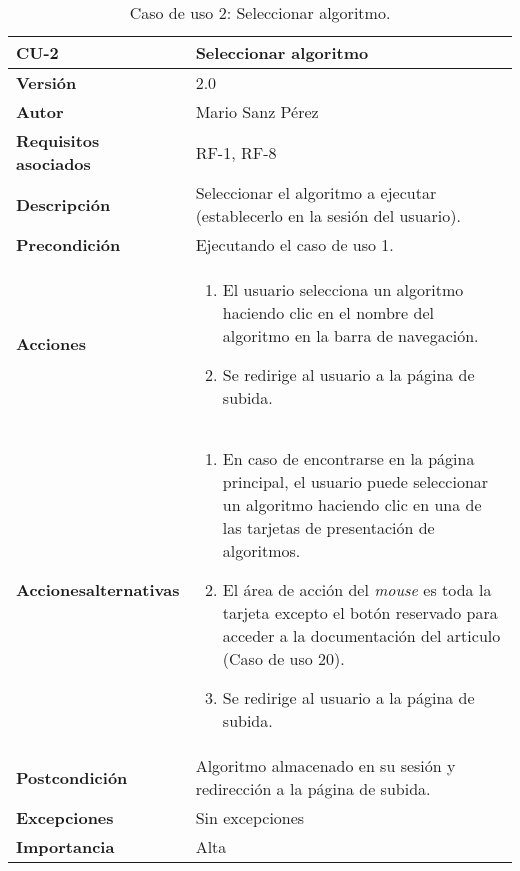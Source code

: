 \begin{table}[p]
	\centering
	\begin{tabularx}{\linewidth}{ p{} p{} }
		\toprule
		\textbf{CU-2}    & \textbf{Seleccionar algoritmo}\\
		\toprule
		\textbf{Versión}              & 2.0    \\
		\textbf{Autor}                & Mario Sanz Pérez \\
		\textbf{Requisitos asociados} & RF-1, RF-8 \\
		\textbf{Descripción}          & Seleccionar el algoritmo a ejecutar (establecerlo en la sesión del usuario). \\
		\textbf{Precondición}         & Ejecutando el caso de uso 1. \\
		\textbf{Acciones}             &
		\begin{enumerate}
			\def\labelenumi{\arabic{enumi}.}
			\tightlist
			\item El usuario selecciona un algoritmo haciendo clic en el nombre del algoritmo en la barra de navegación.
			\item Se redirige al usuario a la página de subida.
		\end{enumerate}\\
		\textbf{Acciones\newline alternativas}&
		\begin{enumerate}
			\def\labelenumi{\arabic{enumi}.}
			\tightlist
			\item En caso de encontrarse en la página principal, el usuario
			puede seleccionar un algoritmo haciendo clic en una de las tarjetas de
			presentación de algoritmos.
			\item El área de acción del \textit{mouse} es toda la tarjeta excepto el botón reservado para acceder a la documentación del articulo (Caso de uso 20).
			\item Se redirige al usuario a la página de subida. \end{enumerate}\\
		\textbf{Postcondición}        & Algoritmo almacenado en su sesión y redirección a la página de subida. \\
		\textbf{Excepciones}          & Sin excepciones \\
		\textbf{Importancia}          & Alta \\
		\bottomrule
	\end{tabularx}
	\caption{Caso de uso 2: Seleccionar algoritmo.}
\end{table}

